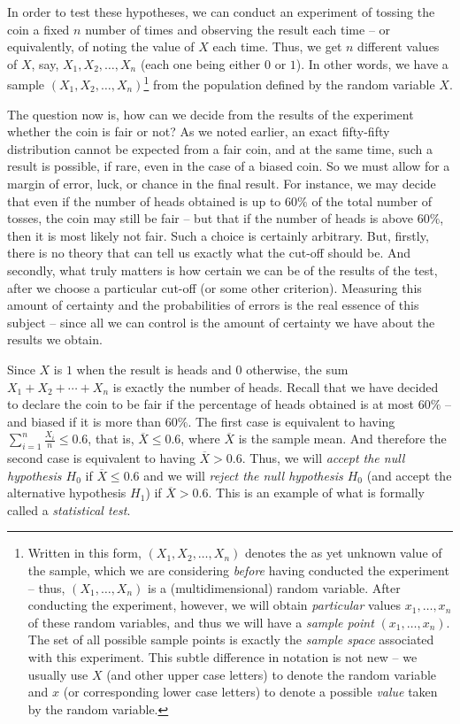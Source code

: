 \documentclass[svgnames, a5paper]{article}
\theoremstyle{definition}
\theoremstyle{remark}
\begin{document}
In order to test these hypotheses, we can conduct an experiment of tossing the coin a fixed $n$ number of times and observing the result each time -- or equivalently, of noting the value of $X$ each time. Thus, we get $n$ different values of $X$, say, $X_1, X_2, \ldots, X_n$ (each one being either $0$ or $1$). In other words, we have a sample
$(X_1, X_2, \ldots, X_n)$\footnote{
	Written in this form, $(X_1, X_2, \ldots, X_n)$ denotes the as yet unknown value of the sample, which we are considering \emph{before} having conducted the experiment -- thus, $(X_1, \ldots, X_n)$ is a (multidimensional) random variable. After conducting the experiment, however, we will obtain \emph{particular} values $x_1, \ldots, x_n$ of these random variables, and thus we will have a \emph{sample point} $(x_1, \ldots, x_n)$. The set of all possible sample points is exactly the \emph{sample space} associated with this experiment. This subtle difference in notation is not new -- we usually use $X$ (and other upper case letters) to denote the random variable and $x$ (or corresponding lower case letters) to denote a possible \emph{value} taken by the random variable.
}
from the population defined by the random variable $X$.

The question now is, how can we decide from the results of the experiment whether the coin is fair or not? As we noted earlier, an exact fifty-fifty distribution cannot be expected from a fair coin, and at the same time, such a result is possible, if rare, even in the case of a biased coin. So we must allow for a margin of error, luck, or chance in the final result. For instance, we may decide that even if the number of heads obtained is up to $60\%$ of the total number of tosses, the coin may still be fair -- but that if the number of heads is above $60\%$, then it is most likely not fair. Such a choice is certainly arbitrary. But, firstly, there is no theory that can tell us exactly what the cut-off should be. And secondly, what truly matters is how certain we can be of the results of the test, after we choose a particular cut-off (or some other criterion). Measuring this amount of certainty and the probabilities of errors is the real essence of this subject -- since all we can control is the amount of certainty we have about the results we obtain.

Since $X$ is $1$ when the result is heads and $0$ otherwise, the sum $X_1 + X_2 + \cdots + X_n$ is exactly the number of heads. Recall that we have decided to declare the coin to be fair if the percentage of heads obtained is at most $60\%$ -- and biased if it is more than $60\%$. The first case is equivalent to having $\sum\limits_{i=1}^n \frac{X_i} n \le 0.6$, that is, $\overline X \le 0.6$, where $\overline X$ is the sample mean. And therefore the second case is equivalent to having $\overline X > 0.6$. Thus, we will \emph{accept the null hypothesis $H_0$} if $\overline X \le 0.6$ and we will \emph{reject the null hypothesis $H_0$} (and accept the alternative hypothesis $H_1$)  if $\overline X > 0.6$. This is an example of what is formally called a \emph{statistical test}.
\end{document}

